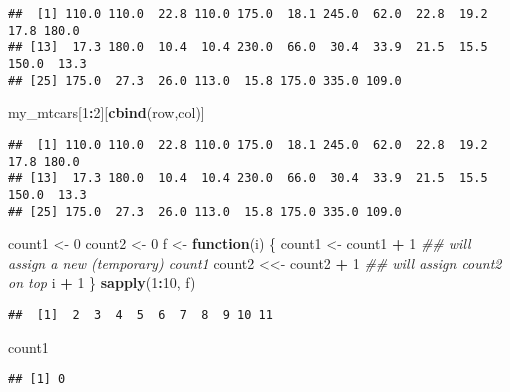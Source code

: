 \documentclass[]{article}
\newenvironment{Shaded}{\begin{snugshade}}{\end{snugshade}}
\newcommand{\CommentTok}[1]{\textcolor[rgb]{0.56,0.35,0.01}{\textit{#1}}}
\newcommand{\ControlFlowTok}[1]{\textcolor[rgb]{0.13,0.29,0.53}{\textbf{#1}}}
\newcommand{\DecValTok}[1]{\textcolor[rgb]{0.00,0.00,0.81}{#1}}
\newcommand{\KeywordTok}[1]{\textcolor[rgb]{0.13,0.29,0.53}{\textbf{#1}}}
\newcommand{\NormalTok}[1]{#1}
\newcommand{\OperatorTok}[1]{\textcolor[rgb]{0.81,0.36,0.00}{\textbf{#1}}}
\newcommand{\StringTok}[1]{\textcolor[rgb]{0.31,0.60,0.02}{#1}}
\begin{document}
\begin{verbatim}
##  [1] 110.0 110.0  22.8 110.0 175.0  18.1 245.0  62.0  22.8  19.2  17.8 180.0
## [13]  17.3 180.0  10.4  10.4 230.0  66.0  30.4  33.9  21.5  15.5 150.0  13.3
## [25] 175.0  27.3  26.0 113.0  15.8 175.0 335.0 109.0
\end{verbatim}

\begin{Shaded}
\begin{Highlighting}[]
\NormalTok{my_mtcars[}\DecValTok{1}\OperatorTok{:}\DecValTok{2}\NormalTok{][}\KeywordTok{cbind}\NormalTok{(row,col)]}
\end{Highlighting}
\end{Shaded}

\begin{verbatim}
##  [1] 110.0 110.0  22.8 110.0 175.0  18.1 245.0  62.0  22.8  19.2  17.8 180.0
## [13]  17.3 180.0  10.4  10.4 230.0  66.0  30.4  33.9  21.5  15.5 150.0  13.3
## [25] 175.0  27.3  26.0 113.0  15.8 175.0 335.0 109.0
\end{verbatim}

\begin{Shaded}
\begin{Highlighting}[]
\NormalTok{count1 <-}\StringTok{ }\DecValTok{0}
\NormalTok{count2 <-}\StringTok{ }\DecValTok{0}
\NormalTok{f <-}\StringTok{ }\ControlFlowTok{function}\NormalTok{(i) \{}
\NormalTok{  count1 <-}\StringTok{  }\NormalTok{count1 }\OperatorTok{+}\StringTok{ }\DecValTok{1}  \CommentTok{## will assign a new (temporary) count1}
\NormalTok{  count2 <<-}\StringTok{ }\NormalTok{count2 }\OperatorTok{+}\StringTok{ }\DecValTok{1}  \CommentTok{## will assign count2 on top}
\NormalTok{  i }\OperatorTok{+}\StringTok{ }\DecValTok{1}
\NormalTok{\}}
\KeywordTok{sapply}\NormalTok{(}\DecValTok{1}\OperatorTok{:}\DecValTok{10}\NormalTok{, f)}
\end{Highlighting}
\end{Shaded}

\begin{verbatim}
##  [1]  2  3  4  5  6  7  8  9 10 11
\end{verbatim}

\begin{Shaded}
\begin{Highlighting}[]
\NormalTok{count1}
\end{Highlighting}
\end{Shaded}

\begin{verbatim}
## [1] 0
\end{verbatim}
\end{document}
